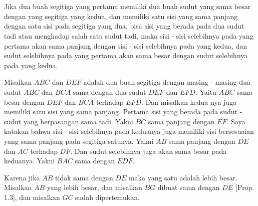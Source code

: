 \documentclass[a4paper]{book}
\begin{document}
\section*{\centering \thesection}
Jika dua buah segitiga yang pertama memiliki dua buah sudut yang sama besar
dengan yang segitiga yang kedua, dan memiliki satu sisi yang sama panjang dengan
satu sisi pada segitiga yang dua, bisa sisi yang berada pada dua sudut tadi atau
menghadap salah satu sudut tadi, maka sisi - sisi selebihnya pada yang 
pertama akan sama panjang dengan sisi - sisi selebihnya pada yang kedua, dan 
sudut selebihnya pada yang pertama akan sama besar dengan sudut selebihnya pada
yang kedua.
\begin{center}
\end{center}


Misalkan $ABC$ dan $DEF$ adalah dua buah segitiga dengan masing - masing dua 
sudut $ABC$ dan $BCA$ sama dengan dua sudut $DEF$ dan $EFD$.  Yaitu $ABC$ sama
besar dengan $DEF$ dan $BCA$ terhadap $EFD$. Dan misalkan kedua nya juga 
memiliki satu sisi yang sama panjang. Pertama sisi yang berada pada sudut - sudut
yang berpasangan sama tadi. Yakni $BC$ sama panjang dengan $EF$. Saya katakan bahwa
sisi - sisi selebihnya pada keduanya juga memiliki sisi bersesuaian yang sama 
panjang pada segitiga satunya. Yakni $AB$ sama panjang dengan $DE$ dan $AC$ 
terhadap $DF$.  Dan sudut selebihnya juga akan sama besar pada keduanya. 
Yakni $BAC$ sama dengan $EDF$.

Karena jika $AB$ tidak sama dengan $DE$ maka yang satu adalah lebih besar. Misalkan
$AB$ yang lebih besar, dan misalkan $BG$ dibuat sama dengan $DE$ [Prop. 1.3], dan
misalkan $GC$ sudah dipertemukan.
\end{document}
